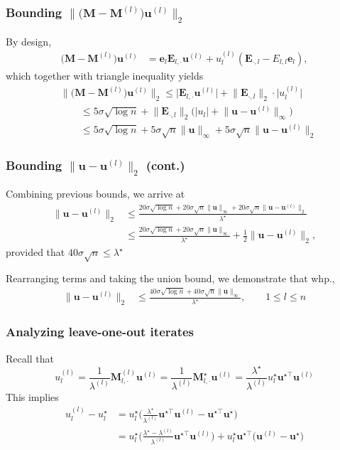 \documentclass[compress,
mathserif,wide,%
]{beamer}
\begin{document}
\begin{frame}
	\frametitle{Bounding $\|\big(\bm{M}-\bm{M}^{(l)}\big)\bm{u}^{(l)}\|_{2}$}
By design, 	
\begin{align*}
\big(\bm{M}-\bm{M}^{(l)}\big)\bm{u}^{(l)} & =\bm{e}_{l}\bm{E}_{l,\cdot}\bm{u}^{(l)}+u_{l}^{(l)}(\bm{E}_{\cdot,l} - E_{l,l}\bm{e}_{l}),
\end{align*}
which together with triangle inequality yields
\begin{align*}
 & \|\big(\bm{M}-\bm{M}^{(l)}\big)\bm{u}^{(l)}\|_{2}
	\leq \big|\bm{E}_{l,\cdot}\bm{u}^{(l)}\big|  +
	 \big\|\bm{E}_{\cdot,l}\big\|_{2} \cdot \big|u_{l}^{(l)}\big| \\
 & \qquad \leq5\sigma\sqrt{\log n}+\big\|\bm{E}_{\cdot,l}\big\|_{2}\big(\big|u_{l}\big|+\big\|\bm{u}-\bm{u}^{(l)}\big\|_{\infty}\big)\\
 & \qquad \leq5\sigma\sqrt{\log n}+5\sigma\sqrt{n}\|\bm{u}\|_{\infty}+5\sigma\sqrt{n}\big\|\bm{u}-\bm{u}^{(l)}\big\|_{2}
\end{align*}
\end{frame}

\begin{frame}
	\frametitle{Bounding $\|\bm{u} - \bm{u}^{(l)}\|_{2}$ (cont.)}
	Combining previous bounds, we arrive at
\begin{align*}
\big\|\bm{u}-\bm{u}^{(l)}\big\|_{2}
 & \leq \frac{20\sigma\sqrt{\log n}+20\sigma\sqrt{n}\|\bm{u}\|_{\infty}+20\sigma\sqrt{n}\big\|\bm{u}-\bm{u}^{(l)}\big\|_{2}}{\lambda^{\star}}\\
 & \leq\frac{20\sigma\sqrt{\log n}+20\sigma\sqrt{n}\|\bm{u}\|_{\infty}}{\lambda^{\star}}+\frac{1}{2}\big\|\bm{u}-\bm{u}^{(l)}\big\|_{2},
\end{align*}
%
provided that $40\sigma\sqrt{n}\leq \lambda^{\star}$



Rearranging terms and taking the union bound, we demonstrate that whp.,
%
\begin{align*}
\big\|\bm{u}-\bm{u}^{(l)}\big\|_{2} & \leq\frac{40\sigma\sqrt{\log n}+40\sigma\sqrt{n}\|\bm{u}\|_{\infty}}{\lambda^{\star}} , \qquad 1\leq l\leq n
\end{align*}
\end{frame}



\begin{frame}
	\frametitle{Analyzing leave-one-out iterates}
	Recall that 
	\[
	u_{l}^{(l)} =\frac{1}{\lambda^{(l)}}\bm{M}_{l,\cdot}^{(l)}\bm{u}^{(l)}=\frac{1}{\lambda^{(l)}}\bm{M}_{l,\cdot}^{\star}\bm{u}^{(l)}=\frac{\lambda^{\star}}{\lambda^{(l)}}u_{l}^{\star}\bm{u}^{\star\top}\bm{u}^{(l)}
	\]
	This implies 
	\begin{align*}
u_{l}^{(l)}-u_{l}^{\star} & %
=u_{l}^{\star}\Big(\frac{\lambda^{\star}}{\lambda^{(l)}}\bm{u}^{\star\top}\bm{u}^{(l)}-\bm{u}^{\star\top}\bm{u}^{\star}\Big)\\
 & =u_{l}^{\star}\Big(\frac{\lambda^{\star}-\lambda^{(l)}}{\lambda^{(l)}}\bm{u}^{\star\top}\bm{u}^{(l)}\Big)+u_{l}^{\star}\bm{u}^{\star\top}\big(\bm{u}^{(l)}-\bm{u}^{\star}\big)
\end{align*}
\end{frame}
\end{document}
